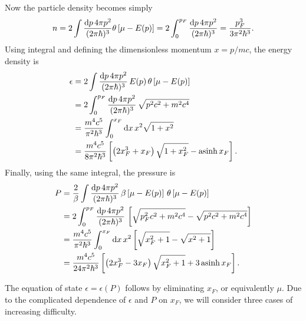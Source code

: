 Now the particle density  becomes simply
\begin{equation}
	n = 
	2 \int \frac{\mathop{}\!\mathrm{d} p \, 4 \pi p^2}{(2 \pi \hbar)^3} \theta \left[ \mu - E(p) \right] =
	2 \int_0^{p_F} \frac{\mathop{}\!\mathrm{d} p \, 4 \pi p^2}{(2 \pi \hbar)^3} = \frac{p_F^3}{3 \pi^2 \hbar^3} .
\label{eq:nstars:density_zeroT}
\end{equation}
Using integral  and defining the dimensionless momentum $x = p / mc$, the energy density is
\begin{equation}
\begin{split}
	\epsilon &=  2 \int \frac{\mathop{}\!\mathrm{d} p \, 4 \pi p^2}{(2 \pi \hbar)^3} \, E(p) \, \theta \left[ \mu - E(p) \right] \\
	         &=  2 \int_0^{p_F} \frac{\mathop{}\!\mathrm{d} p \, 4 \pi p^2}{(2 \pi \hbar)^3} \, \sqrt{p^2 c^2 + m^2 c^4} \\
	         &= \frac{m^4 c^5}{\pi^2 \hbar^3} \int_0^{x_F} \mathop{}\!\mathrm{d} x \, x^2 \sqrt{1 + x^2} \\
	         &= \frac{m^4 c^5}{8 \pi^2 \hbar^3} \left[ \left( 2 x_F^3 + x_F \right) \sqrt{1 + x_F^2} - \operatorname{asinh} x_F \right] . \\
\end{split}
\label{eq:nstars:energy_density_zeroT}
\end{equation}
Finally, using the same integral, the pressure is
\begin{equation}
\begin{split}
	P &= \frac{2}{\beta} \int \frac{\mathop{}\!\mathrm{d} p \, 4 \pi p^2}{(2 \pi \hbar)^3} \, \beta \left[ \mu - E(p) \right] \, \theta \left[ \mu - E(p) \right] \\
	  &= 2 \int_0^{p_F} \frac{\mathop{}\!\mathrm{d} p \, 4 \pi p^2}{(2 \pi \hbar)^3} \, \left[ \sqrt{p_F^2 c^2 + m^2 c^4} - \sqrt{p^2 c^2 + m^2 c^4} \right] \\
	  &= \frac{m^4 c^5}{\pi^2 \hbar^3} \int_0^{x_F} \mathop{}\!\mathrm{d} x \, x^2 \left[ \sqrt{x_F^2+1} - \sqrt{x^2+1} \right] \\
	  &= \frac{m^4 c^5}{24 \pi^2 \hbar^3} \left[ \left( 2 x_F^3 - 3 x_F \right) \sqrt{x_F^2 + 1} + 3 \operatorname{asinh} x_F \right] . \\
\end{split}
\label{eq:nstars:pressure_zeroT}
\end{equation}

The equation of state $\epsilon = \epsilon(P)$ follows by eliminating $x_F$, or equivalently $\mu$.
Due to the complicated dependence of $\epsilon$ and $P$ on $x_F$, we will consider three cases of increasing difficulty.


